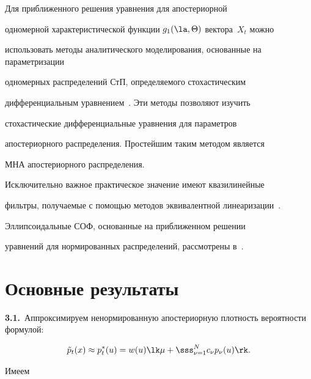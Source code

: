  Для приближенного решения уравнения  для апостериорной

одномерной характеристической функции  $g_1(\la, \Theta)$ вектора~$X_t$ можно

использовать методы аналитического моделирования, основанные на параметризации 

одномерных  распределений СтП, определяемого стохастическим

 дифференциальным уравнением~\cite{6-s2}.  Эти методы  позволяют изучить

 стохастические дифференциальные уравнения для параметров

 апостериорного распределения. Простейшим таким методом является

 МНА апостериорного распределения.

Исключительно важное практическое значение имеют квазилинейные

фильтры, получаемые с помощью методов эквивалентной линеаризации~\cite{6-s2}.

Эллипсоидальные СОФ, основанные на приближенном решении 

уравнений для нормированных распределений, рассмотрены в~\cite{2-s2}.



\vspace*{-4pt}



\section{Основные результаты}



\vspace*{-2pt}



\textbf{3.1.}\ Аппроксимируем ненормированную апостериорную плотность вероят\-ности формулой:



\noindent

\begin{equation}

\tilde p_t (x) \approx p_t^* (u) =w(u) \lk \mu+ \sss_{\nu=1}^N

    c_\nu p_\nu (u)\rk.\label{e3.1-s2}

    \end{equation}

Имеем



\noindent

